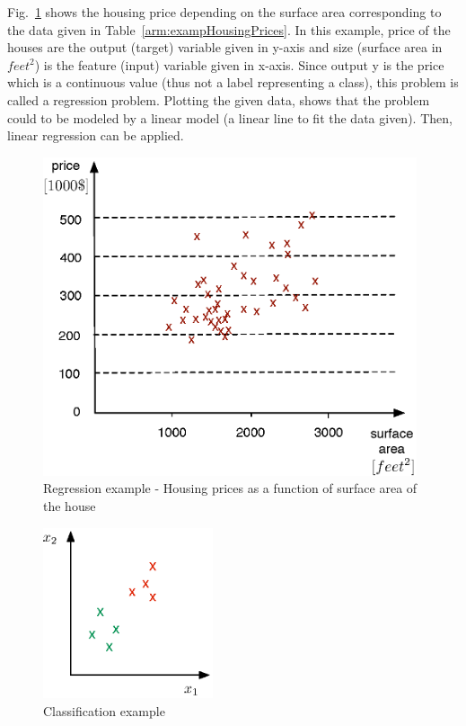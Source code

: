 Fig.~\ref{fig:housingPrices} shows the housing price depending on the surface area corresponding to the data given in Table~\ref{arm:exampHousingPrices}.
In this example, price of the houses are the output (target) variable given in y-axis and size (surface area in $feet^2$) is the feature (input) variable given in x-axis. 
Since output y is the price which is a continuous value (thus not a label representing a class), this problem is called a regression problem. Plotting the given data, shows that the problem could to be modeled by a linear model (a linear line to fit the data given). Then, linear regression can be applied.

\begin{figure}
\begin{center}
\includegraphics[width=11cm]{figures/linearRegressionExamp}    %
\caption{Regression example - Housing prices as a function of surface area of the house \cite{andrewNg_MachLearning}} 
\label{fig:housingPrices}
\end{center}
\end{figure}

\begin{figure}
\begin{center}
\includegraphics[width=5cm]{figures/classificationEx2}    %
\caption{Classification example} 
\label{fig:classificationEx2}
\end{center}
\end{figure}

